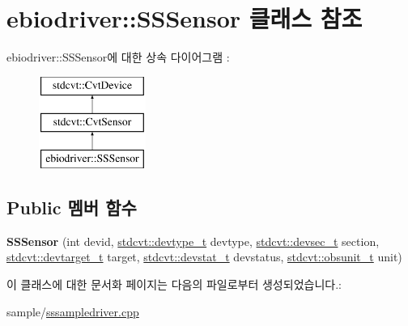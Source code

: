 \hypertarget{classebiodriver_1_1SSSensor}{}\section{ebiodriver\+:\+:S\+S\+Sensor 클래스 참조}
\label{classebiodriver_1_1SSSensor}
ebiodriver\+:\+:S\+S\+Sensor에 대한 상속 다이어그램 \+: \begin{figure}[H]
\begin{center}
\leavevmode
\includegraphics[height=3.000000cm]{classebiodriver_1_1SSSensor}
\end{center}
\end{figure}
\subsection*{Public 멤버 함수}
\begin{DoxyCompactItemize}
\item 
{\bfseries S\+S\+Sensor} (int devid, \hyperlink{cvtcode_8h_ae8e34073e35cef0bb47c7fa535fc638b}{stdcvt\+::devtype\+\_\+t} devtype, \hyperlink{cvtcode_8h_a268eebb73363e24b9e65fd51973bd9c0}{stdcvt\+::devsec\+\_\+t} section, \hyperlink{cvtcode_8h_a2b37fd5cc4d40c0b8c4b987c271e5ceb}{stdcvt\+::devtarget\+\_\+t} target, \hyperlink{cvtcode_8h_ad21cd565f839adc5b19a0993e7da7278}{stdcvt\+::devstat\+\_\+t} devstatus, \hyperlink{cvtcode_8h_a6d4ed81d95144c5eedcd08eda1e800a4}{stdcvt\+::obsunit\+\_\+t} unit)\hypertarget{classebiodriver_1_1SSSensor_aa1fef3c59c8d1ef97426b18ee10fa1ea}{}\label{classebiodriver_1_1SSSensor_aa1fef3c59c8d1ef97426b18ee10fa1ea}

\end{DoxyCompactItemize}


이 클래스에 대한 문서화 페이지는 다음의 파일로부터 생성되었습니다.\+:\begin{DoxyCompactItemize}
\item 
sample/\hyperlink{sssampledriver_8cpp}{sssampledriver.\+cpp}\end{DoxyCompactItemize}
